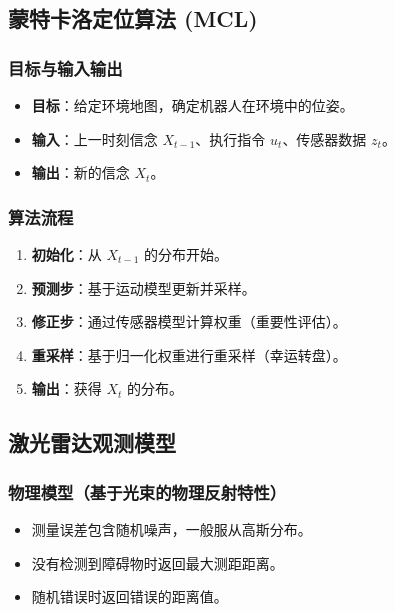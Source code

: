 \documentclass[11pt,a4paper]{article}
\begin{document}
\subsection{蒙特卡洛定位算法 (MCL)}

\subsubsection*{目标与输入输出}
\begin{itemize}
  \item \textbf{目标}：给定环境地图，确定机器人在环境中的位姿。
  \item \textbf{输入}：上一时刻信念 $X_{t-1}$、执行指令 $u_t$、传感器数据 $z_t$。
  \item \textbf{输出}：新的信念 $X_t$。
\end{itemize}

\subsubsection*{算法流程}
\begin{enumerate}
  \item \textbf{初始化}：从 $X_{t-1}$ 的分布开始。
  \item \textbf{预测步}：基于运动模型更新并采样。
  \item \textbf{修正步}：通过传感器模型计算权重（重要性评估）。
  \item \textbf{重采样}：基于归一化权重进行重采样（幸运转盘）。
  \item \textbf{输出}：获得 $X_t$ 的分布。
\end{enumerate}

\subsection{激光雷达观测模型}

\subsubsection*{物理模型（基于光束的物理反射特性）}
\begin{itemize}
  \item 测量误差包含随机噪声，一般服从高斯分布。
  \item 没有检测到障碍物时返回最大测距距离。
  \item 随机错误时返回错误的距离值。
\end{itemize}
\end{document}
